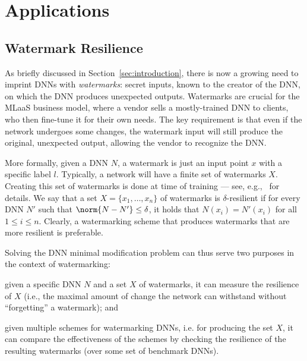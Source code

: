 \documentclass{easychair}
\begin{document}
\section{Applications}
\label{sec:applications}

\subsection{Watermark Resilience}
As briefly discussed in Section~\ref{sec:introduction}, there is now a
growing need to imprint DNNs with \emph{watermarks}: secret inputs,
known to the creator of the DNN, on which the DNN produces unexpected
outputs. Watermarks are crucial for the MLaaS business model, where
a vendor sells a mostly-trained DNN to clients, who then fine-tune
it for their own needs. The key requirement is that even if the
network undergoes some changes, the watermark input will still produce
the original, unexpected output, allowing the vendor to recognize the
DNN.

More formally, given a DNN $N$, a watermark is just an input point $x$
with a specific label $l$. Typically, a network will have a finite set of
watermarks $X$. Creating this set of watermarks is done at time of
training --- see, e.g.,~\cite{AdBaPiKeWatermarking} for details. We
say that a set $X=\{x_1,\ldots,x_n\}$ of watermarks is $\delta$-resilient if for every
DNN $N'$ such that $\norm{N-N'}\leq \delta$, it holds that
$N(x_i)=N'(x_i)$ for all $1\leq i \leq n$. Clearly, a watermarking
scheme that produces watermarks that are more resilient is preferable.

Solving the DNN minimal modification problem can thus serve two
purposes in the context of watermarking:
\begin{inparaenum}[(i)]
  \item given a specific DNN $N$ and a set $X$ of watermarks, it can
    measure the resilience of $X$ (i.e., the maximal amount of change
    the network can withstand without ``forgetting'' a  watermark);
    and
  \item given multiple schemes for watermarking DNNs, i.e. for
    producing the set $X$, it can compare the effectiveness of the
    schemes by checking the resilience of the resulting watermarks
    (over some set of benchmark DNNs).
\end{inparaenum}
  
\end{document}
